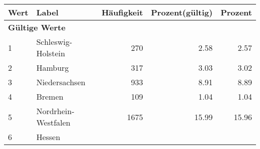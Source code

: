      \begin{longtable}{lXrrr}
     \toprule
     \textbf{Wert} & \textbf{Label} & \textbf{Häufigkeit} & \textbf{Prozent(gültig)} & \textbf{Prozent} \\
     \endhead
     \midrule
     \multicolumn{5}{l}{\textbf{Gültige Werte}}\\

     1 &
     \multicolumn{1}{X}{ Schleswig-Holstein   } &


       \num{270} &
       \num[round-mode=places,round-precision=2]{2,58} &
         \num[round-mode=places,round-precision=2]{2,57} \\

     2 &
     \multicolumn{1}{X}{ Hamburg   } &


       \num{317} &
       \num[round-mode=places,round-precision=2]{3,03} &
         \num[round-mode=places,round-precision=2]{3,02} \\

     3 &
     \multicolumn{1}{X}{ Niedersachsen   } &


       \num{933} &
       \num[round-mode=places,round-precision=2]{8,91} &
         \num[round-mode=places,round-precision=2]{8,89} \\

     4 &
     \multicolumn{1}{X}{ Bremen   } &


       \num{109} &
       \num[round-mode=places,round-precision=2]{1,04} &
         \num[round-mode=places,round-precision=2]{1,04} \\

     5 &
     \multicolumn{1}{X}{ Nordrhein-Westfalen   } &


       \num{1675} &
       \num[round-mode=places,round-precision=2]{15,99} &
         \num[round-mode=places,round-precision=2]{15,96} \\

     6 &
     \multicolumn{1}{X}{ Hessen   } &



\end{longtable}
